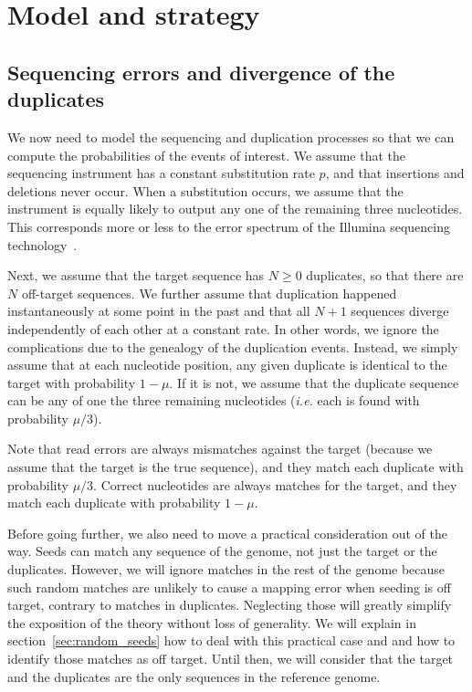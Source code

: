 \documentclass{article}
\begin{document}
\section{Model and strategy}
\label{sec:symbolic}

\subsection{Sequencing errors and divergence of the duplicates}
\label{sec:error}

We now need to model the sequencing and duplication processes so that
we can compute the probabilities of the events of interest. We assume that
the sequencing instrument has a constant substitution rate $p$, and that
insertions and deletions never occur. When a substitution occurs, we
assume that the instrument is equally likely to output any one of the
remaining three nucleotides. This corresponds more or less to the error
spectrum of the Illumina sequencing technology~\cite{pmid21576222}.

Next, we assume that the target sequence has $N \geq 0$ duplicates, so
that there are $N$ off-target sequences. We further assume that
duplication happened instantaneously at some point in the past and that
all $N+1$ sequences diverge independently of each other at a constant
rate. In other words, we ignore the complications due to the genealogy of
the duplication events. Instead, we simply assume that at each nucleotide
position, any given duplicate is identical to the target with probability
$1-\mu$. If it is not, we assume that the duplicate sequence can be any of
one the three remaining nucleotides (\textit{i.e.} each is found with
probability $\mu/3$).

Note that read errors are always mismatches against the target (because we
assume that the target is the true sequence), and they match each
duplicate with probability $\mu/3$. Correct nucleotides are always matches
for the target, and they match each duplicate with probability $1-\mu$.

Before going further, we also need to move a practical consideration out
of the way. Seeds can match any sequence of the genome, not just the
target or the duplicates. However, we will ignore matches in the rest of
the genome because such random matches are unlikely to cause a mapping
error when seeding is off target, contrary to matches in duplicates.
Neglecting those will greatly simplify the exposition of the theory
without loss of generality. We will explain in
section~\ref{sec:random_seeds} how to deal with this practical case and
and how to identify those matches as off target. Until then, we will
consider that the target and the duplicates are the only sequences in the
reference genome.
\end{document}
